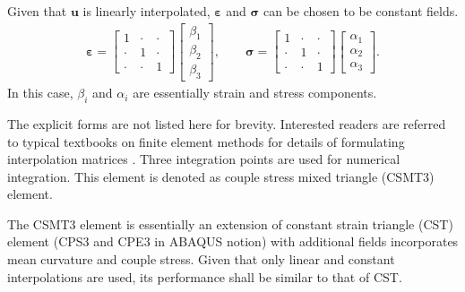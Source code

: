 \documentclass[3p,sort&compress,11pt,fleqn]{elsarticle}
\begin{document}
Given that $\mathbold{u}$ is linearly interpolated, $\mathbold{\varepsilon}$ and $\mathbold{\sigma}$ can be chosen to be constant fields.
\begin{gather}
\mathbold{\varepsilon}=\begin{bmatrix}
1&\cdot&\cdot\\\cdot&1&\cdot\\\cdot&\cdot&1
\end{bmatrix}\begin{bmatrix}
\beta_1\\\beta_2\\\beta_3
\end{bmatrix},\qquad
\mathbold{\sigma}=\begin{bmatrix}
1&\cdot&\cdot\\\cdot&1&\cdot\\\cdot&\cdot&1
\end{bmatrix}\begin{bmatrix}
\alpha_1\\\alpha_2\\\alpha_3
\end{bmatrix}.
\end{gather}
In this case, $\beta_i$ and $\alpha_i$ are essentially strain and stress components.

The explicit forms are not listed here for brevity. Interested readers are referred to typical textbooks on finite element methods for details of formulating interpolation matrices \citep[see, e.g.,][section 5.1.3.1]{Zienkiewicz2013}. Three integration points are used for numerical integration. This element is denoted as couple stress mixed triangle (CSMT3) element.

The CSMT3 element is essentially an extension of constant strain triangle (CST) element (CPS3 and CPE3 in ABAQUS notion) with additional fields incorporates mean curvature and couple stress. Given that only linear and constant interpolations are used, its performance shall be similar to that of CST.
\end{document}
